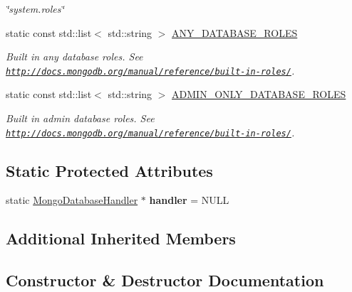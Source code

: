 \begin{DoxyCompactItemize}
\begin{DoxyCompactList}\small\item\em \char`\"{}system.\+roles\char`\"{} \end{DoxyCompactList}\item 
static const std\+::list$<$ std\+::string $>$ \hyperlink{classrepo_1_1core_1_1handler_1_1_mongo_database_handler_a963d231d4bb42ae5ac36f70eddbb8068}{A\+N\+Y\+\_\+\+D\+A\+T\+A\+B\+A\+S\+E\+\_\+\+R\+O\+L\+E\+S}
\begin{DoxyCompactList}\small\item\em Built in any database roles. See \href{http://docs.mongodb.org/manual/reference/built-in-roles/}{\tt http\+://docs.\+mongodb.\+org/manual/reference/built-\/in-\/roles/}. \end{DoxyCompactList}\item 
static const std\+::list$<$ std\+::string $>$ \hyperlink{classrepo_1_1core_1_1handler_1_1_mongo_database_handler_aef93abfc2e7cdf3108aa8cc170c2cc69}{A\+D\+M\+I\+N\+\_\+\+O\+N\+L\+Y\+\_\+\+D\+A\+T\+A\+B\+A\+S\+E\+\_\+\+R\+O\+L\+E\+S}
\begin{DoxyCompactList}\small\item\em Built in admin database roles. See \href{http://docs.mongodb.org/manual/reference/built-in-roles/}{\tt http\+://docs.\+mongodb.\+org/manual/reference/built-\/in-\/roles/}. \end{DoxyCompactList}\end{DoxyCompactItemize}
\subsection*{Static Protected Attributes}
\begin{DoxyCompactItemize}
\item 
\hypertarget{classrepo_1_1core_1_1handler_1_1_mongo_database_handler_a98e94b48236aea664f31f22698885396}{}static \hyperlink{classrepo_1_1core_1_1handler_1_1_mongo_database_handler}{Mongo\+Database\+Handler} $\ast$ {\bfseries handler} = N\+U\+L\+L\label{classrepo_1_1core_1_1handler_1_1_mongo_database_handler_a98e94b48236aea664f31f22698885396}

\end{DoxyCompactItemize}
\subsection*{Additional Inherited Members}


\subsection{Constructor \& Destructor Documentation}
\hypertarget{classrepo_1_1core_1_1handler_1_1_mongo_database_handler_a5a8444437b564686632dce0ec6f592fb}{}
